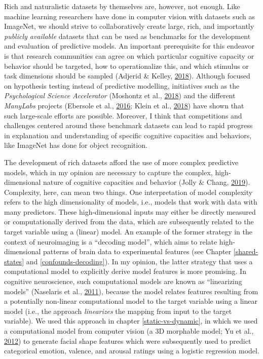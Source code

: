 \documentclass[11pt,american,a4paper,oneside,]{memoir} %
\begin{document}
Rich and naturalistic datasets by themselves are, however, not enough. Like machine learning researchers have done in computer vision with datasets such as ImageNet, we should strive to collaboratively create large, rich, and importantly \emph{publicly available} datasets that can be used as benchmarks for the development and evaluation of predictive models. An important prerequisite for this endeavor is that research communities can agree on which particular cognitive capacity or behavior should be targeted, how to operationalize this, and which stimulus or task dimensions should be sampled (Adjerid \& Kelley, \protect\hyperlink{ref-Adjerid2018-vs}{2018}). Although focused on hypothesis testing instead of predictive modelling, initiatives such as the \emph{Psychological Science Accelerator} (Moshontz et al., \protect\hyperlink{ref-Moshontz2018-rc}{2018}) and the different \emph{ManyLabs} projects (Ebersole et al., \protect\hyperlink{ref-Ebersole2016-cr}{2016}; Klein et al., \protect\hyperlink{ref-Klein2018-un}{2018}) have shown that such large-scale efforts are possible. Moreover, I think that competitions and challenges centered around these benchmark datasets can lead to rapid progress in explanation and understanding of specific cognitive capacities and behaviors, like ImageNet has done for object recognition.

The development of rich datasets afford the use of more complex predictive models, which in my opinion are necessary to capture the complex, high-dimensional nature of cognitive capacities and behavior (Jolly \& Chang, \protect\hyperlink{ref-Jolly2019-lx}{2019}). Complexity, here, can mean two things. One interpretation of model complexity refers to the high dimensionality of models, i.e., models that work with data with many predictors. These high-dimensional inputs may either be directly measured or computationally derived from the data, which are subsequently related to the target variable using a (linear) model. An example of the former strategy in the context of neuroimaging is a ``decoding model'', which aims to relate high-dimensional patterns of brain data to experimental features (see Chapter \ref{shared-states} and \ref{confounds-decoding}). In my opinion, the latter strategy that uses a computational model to explicitly derive model features is more promising. In cognitive neuroscience, such computational models are known as ``linearizing models'' (Naselaris et al., \protect\hyperlink{ref-Naselaris2011-oh}{2011}), because the model relates features resulting from a potentially non-linear computational model to the target variable using a linear model (i.e., the approach \emph{linearizes} the mapping from input to the target variable). We used this approach in chapter \ref{static-vs-dynamic}, in which we used a computational model from computer vision (a 3D morphable model; Yu et al., \protect\hyperlink{ref-Yu2012-ag}{2012}) to generate facial shape features which were subsequently used to predict categorical emotion, valence, and arousal ratings using a logistic regression model.
\end{document}
